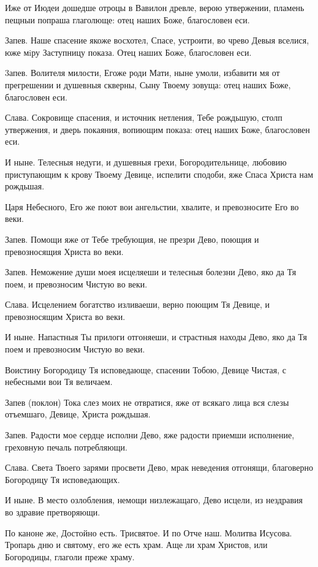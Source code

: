 

Иже от Июдеи дошедше отроцы в Вавилон древле, верою утвержении, пламень пещныи попраша глаголюще: отец наших Боже,   благословен еси.

Запев. Наше спасение якоже восхотел, Спасе, устроити, во чрево Девыя вселися, юже мiру Заступницу показа. Отец наших Боже, благословен еси.

3апев. Волителя милости, Егоже роди Мати, ныне умоли, избавити мя от прегрешении и душевныя скверны, Сыну Твоему зовуща: отец наших Боже, благословен еси.

Слава. Сокровище спасения, и источник нетления, Тебе рождьшую, столп утвержения, и дверь покаяния, вопиющим показа: отец наших Боже, благословен еси.

И ныне. Телесныя недуги, и душевныя грехи, Богородительнице, любовию приступающим к крову Твоему Девице, испелити сподоби, яже Спаса Христа нам рождьшая.




Царя Небесного, Его же поют вои ангельстии, хвалите, и превозносите Его во веки.

Запев. Помощи яже от Тебе требующия, не презри Дево, поющия и превозносящия Христа во веки.

Запев. Неможение души моея исцеляеши и телесныя болезни Дево, яко да Тя поем, и превозносим Чистую во веки.

Слава. Исцелением богатство изливаеши, верно поющим Тя Девице, и превозносящим Христа во веки.

И ныне. Напастныя Ты прилоги отгоняеши, и страстныя находы Дево, яко да Тя поем и превозносим Чистую во веки.




Воистину Богородицу Тя исповедающе, спасении Тобою, Девице Чистая, с небесными вои Тя величаем.

Запев (поклон) Тока слез моих не отвратися, яже от всякаго лица вся слезы отъемшаго, Девице, Христа  рождьшая.

Запев. Радости мое сердце исполни Дево, яже радости приемши исполнение, греховную печаль потребляющи.

Слава. Света Твоего зарями просвети Дево, мрак неведения отгонящи, благоверно Богородицу Тя исповедающих.

И ныне. В место озлобления, немощи низлежащаго, Дево исцели, из нездравия во здравие претворяющи.

По каноне же, Достойно есть. Трисвятое. И по Отче наш. Молитва Исусова. Тропарь дню и святому, его же есть храм. Аще ли храм Христов, или Богородицы, глаголи преже храму.


